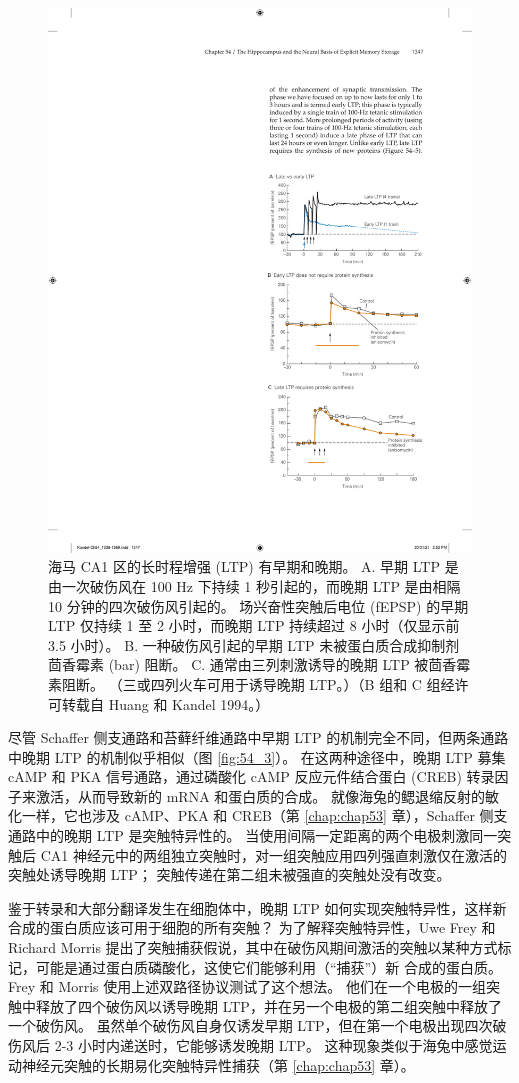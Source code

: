 \begin{figure}[htbp]
	\centering
	\includegraphics[width=0.5\linewidth]{chap54/fig_54_5}
	\caption{海马 CA1 区的长时程增强 (LTP) 有早期和晚期。 A. 早期 LTP 是由一次破伤风在 100 Hz 下持续 1 秒引起的，而晚期 LTP 是由相隔 10 分钟的四次破伤风引起的。 场兴奋性突触后电位 (fEPSP) 的早期 LTP 仅持续 1 至 2 小时，而晚期 LTP 持续超过 8 小时（仅显示前 3.5 小时）。 B. 一种破伤风引起的早期 LTP 未被蛋白质合成抑制剂茴香霉素 (bar) 阻断。 C. 通常由三列刺激诱导的晚期 LTP 被茴香霉素阻断。 （三或四列火车可用于诱导晚期 LTP。）（B 组和 C 组经许可转载自 Huang 和 Kandel 1994。）}
	\label{fig:54_5}
\end{figure}

尽管 Schaffer 侧支通路和苔藓纤维通路中早期 LTP 的机制完全不同，但两条通路中晚期 LTP 的机制似乎相似（图 \ref{fig:54_3}）。 在这两种途径中，晚期 LTP 募集 cAMP 和 PKA 信号通路，通过磷酸化 cAMP 反应元件结合蛋白 (CREB) 转录因子来激活，从而导致新的 mRNA 和蛋白质的合成。 就像海兔的鳃退缩反射的敏化一样，它也涉及 cAMP、PKA 和 CREB（第 \ref{chap:chap53} 章），Schaffer 侧支通路中的晚期 LTP 是突触特异性的。 当使用间隔一定距离的两个电极刺激同一突触后 CA1 神经元中的两组独立突触时，对一组突触应用四列强直刺激仅在激活的突触处诱导晚期 LTP； 突触传递在第二组未被强直的突触处没有改变。

鉴于转录和大部分翻译发生在细胞体中，晚期 LTP 如何实现突触特异性，这样新合成的蛋白质应该可用于细胞的所有突触？ 为了解释突触特异性，Uwe Frey 和 Richard Morris 提出了突触捕获假说，其中在破伤风期间激活的突触以某种方式标记，可能是通过蛋白质磷酸化，这使它们能够利用（“捕获”）新 合成的蛋白质。 Frey 和 Morris 使用上述双路径协议测试了这个想法。 他们在一个电极的一组突触中释放了四个破伤风以诱导晚期 LTP，并在另一个电极的第二组突触中释放了一个破伤风。 虽然单个破伤风自身仅诱发早期 LTP，但在第一个电极出现四次破伤风后 2-3 小时内递送时，它能够诱发晚期 LTP。 这种现象类似于海兔中感觉运动神经元突触的长期易化突触特异性捕获（第 \ref{chap:chap53} 章）。

